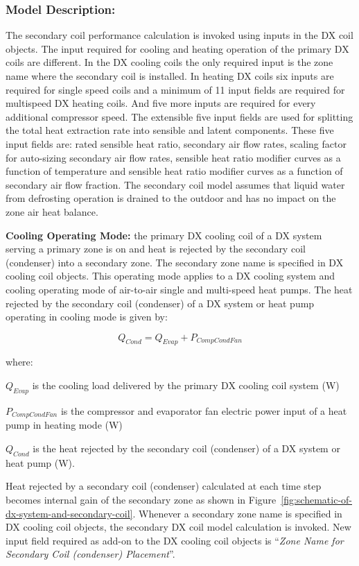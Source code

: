 \subsubsection{Model Description:}\label{model-description-12}

The secondary coil performance calculation is invoked using inputs in the DX coil objects. The input required for cooling and heating operation of the primary DX coils are different. In the DX cooling coils the only required input is the zone name where the secondary coil is installed. In heating DX coils six inputs are required for single speed coils and a minimum of 11 input fields are required for multispeed DX heating coils. And five more inputs are required for every additional compressor speed. The extensible five input fields are used for splitting the total heat extraction rate into sensible and latent components. These five input fields are: rated sensible heat ratio, secondary air flow rates, scaling factor for auto-sizing secondary air flow rates, sensible heat ratio modifier curves as a function of temperature and sensible heat ratio modifier curves as a function of secondary air flow fraction. The secondary coil model assumes that liquid water from defrosting operation is drained to the outdoor and has no impact on the zone air heat balance.

\textbf{Cooling Operating Mode:} the primary DX cooling coil of a DX system serving a primary zone is on and heat is rejected by the secondary coil (condenser) into a secondary zone. The secondary zone name is specified in DX cooling coil objects. This operating mode applies to a DX cooling system and cooling operating mode of air-to-air single and multi-speed heat pumps. The heat rejected by the secondary coil (condenser) of a DX system or heat pump operating in cooling mode is given by:

\begin{equation}
  Q_{Cond} = Q_{Evap}+P_{CompCondFan}
\end{equation}

where:

\(Q_{Evap}\) is the cooling load delivered by the primary DX cooling coil system (W)

\(P_{CompCondFan}\) is the compressor and evaporator fan electric power input of a heat pump in heating mode (W)

\(Q_{Cond}\) is the heat rejected by the secondary coil (condenser) of a DX system or heat pump (W).

Heat rejected by a secondary coil (condenser) calculated at each time step becomes internal gain of the secondary zone as shown in Figure~\ref{fig:schematic-of-dx-system-and-secondary-coil}. Whenever a secondary zone name is specified in DX cooling coil objects, the secondary DX coil model calculation is invoked. New input field required as add-on to the DX cooling coil objects is ``\emph{Zone Name for Secondary Coil (condenser) Placement}''.

